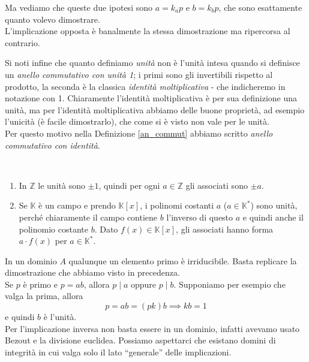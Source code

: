 \begin{osservazione}
\begin{enumerate}
		Ma vediamo che queste due ipotesi sono $a=k_ap$ e $b=k_bp$, che sono esattamente quanto volevo dimostrare. \\ L'implicazione opposta è banalmente la stessa dimostrazione ma ripercorsa al contrario.
	\end{enumerate}
	Si noti infine che quanto definiamo \textit{unità} non è l'unità intesa quando si definisce un \textit{anello commutativo con unità 1}; i primi sono gli invertibili rispetto al prodotto, la seconda è la classica \textit{identità moltiplicativa} - che indicheremo in notazione con 1. Chiaramente l'identità moltiplicativa è per sua definizione una unità, ma per l'identità moltiplicativa abbiamo delle buone proprietà, ad esempio l'unicità (è facile dimostrarlo), che come si è visto non vale per le unità. \\ Per questo motivo nella Definizione \ref{an_commut} abbiamo scritto \textit{anello commutativo con identità}.
\end{osservazione}
\begin{esempio}\
	\begin{enumerate}
		\item In $\mathbb{Z}$ le unità sono $\pm 1$, quindi per ogni $a \in \mathbb{Z}$ gli associati sono $\pm a$.
		\item Se $\mathbb{K}$ è un campo e prendo $\mathbb{K}[x]$, i polinomi costanti $a$ ($a \in \mathbb{K}^*$) sono unità, perché chiaramente il campo contiene $b$ l'inverso di questo $a$ e quindi anche il polinomio costante $b$. Dato $f(x) \in \mathbb{K}[x]$, gli associati hanno forma $a\cdot f(x)$ per $a \in \mathbb{K}^*$.
	\end{enumerate}
\end{esempio}
\begin{osservazione} 
	\label{notinD}
	In un dominio $A$ qualunque un elemento primo è irriducibile. Basta replicare la dimostrazione che abbiamo visto in precedenza.\\
	Se $p$ è primo e $p=ab$, allora $p\mid a$ oppure $p\mid b$. Supponiamo per esempio che valga la prima, allora 
	\begin{equation*}
	p=ab=(pk)b \implies kb=1 
	\end{equation*}
	e quindi $b$ è l'unità. \\ 
	Per l'implicazione inversa non basta essere in un dominio, infatti avevamo usato Bezout e la divisione euclidea. Possiamo aspettarci che esistano domini di integrità in cui valga solo il lato \enquote{generale} delle implicazioni.
\end{osservazione}
